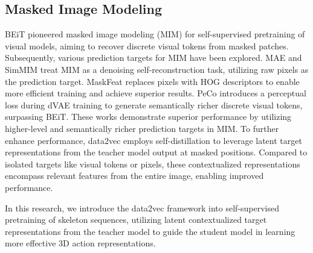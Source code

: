 \subsection{Masked Image Modeling}
BEiT \cite{bao2021beit} pioneered masked image modeling (MIM) for self-supervised pretraining
of visual models, aiming to recover discrete visual tokens from masked patches.
Subsequently, various prediction targets for MIM have been explored. MAE \cite{he2022masked}
and SimMIM \cite{xie2022simmim} treat MIM as a denoising self-reconstruction task, utilizing
raw pixels as the prediction target. MaskFeat \cite{wei2022masked} replaces pixels with HOG
descriptors to enable more efficient training and achieve superior results. PeCo \cite{dong2023peco}
introduces a perceptual loss during dVAE training to generate semantically richer discrete
visual tokens, surpassing BEiT.
These works demonstrate superior performance by utilizing
higher-level and semantically richer prediction targets in MIM.
To further enhance performance,
data2vec \cite{baevski2022data2vec,baevski2023efficient} employs self-distillation to
leverage latent target representations from the teacher model output at masked positions.
Compared to isolated targets like visual tokens or pixels, these contextualized representations
encompass relevant features from the entire image, enabling improved performance.

In this research, we introduce the data2vec framework into self-supervised pretraining of
skeleton sequences, utilizing latent contextualized target representations from the teacher
model to guide the student model in learning more effective 3D action representations.

